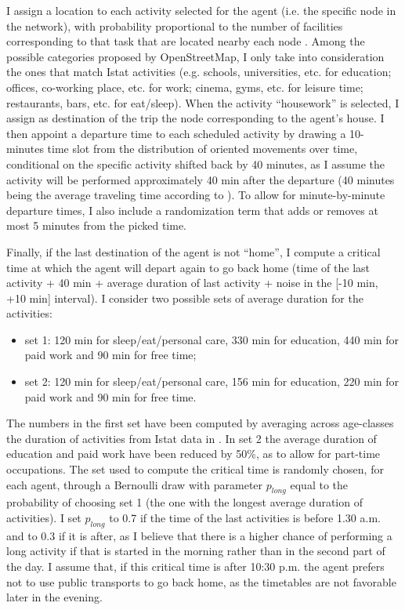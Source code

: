 I assign a location to each activity selected for the agent (i.e. the specific node in the network), with probability proportional to the number of facilities corresponding to that task that are located nearby each node \cite{site9}. Among the possible categories proposed by OpenStreetMap, I only take into consideration the ones that match Istat activities (e.g. schools, universities, etc. for education; offices, co-working place, etc. for work; cinema, gyms, etc. for leisure time; restaurants, bars, etc. for eat/sleep). When the activity “housework” is selected, I assign as destination of the trip the node corresponding to the agent’s house. I then appoint a departure time to each scheduled activity by drawing a 10-minutes time slot from the distribution of oriented movements over time, conditional on the specific activity \cite{site11} shifted back by 40 minutes, as I assume the activity will be performed approximately 40 min after the departure (40 minutes being the average traveling time according to \cite{bib2}). To allow for minute-by-minute departure times, I also include a randomization term that adds or removes at most 5 minutes from the picked time. 

Finally, if the last destination of the agent is not “home”, I compute a critical time at which the agent will depart again to go back home (time of the last activity + 40 min + average duration of last activity + noise in the [-10 min, +10 min] interval). I consider two possible sets of average duration for the activities:
\begin{itemize}
\item set 1: 120 min for sleep/eat/personal care, 330 min for education, 440 min for paid work and 90 min for free time;
\item set 2: 120 min for sleep/eat/personal care, 156 min for education, 220 min for paid work and 90 min for free time.
\end{itemize}
The numbers in the first set have been computed by averaging across age-classes the duration of activities from Istat data in \cite{site11}. In set 2 the average duration of education and paid work have been reduced by 50\%, as to allow for part-time occupations. 
The set used to compute the critical time is randomly chosen, for each agent, through a Bernoulli draw with parameter $p_{long}$ equal to the probability of choosing set 1 (the one with the longest average duration of activities). I set $p_{long}$ to 0.7 if the time of the last activities is before 1.30 a.m. and to 0.3 if it is after, as I believe that there is a higher chance of performing a long activity if that is started in the morning rather than in the second part of the day.
I assume that, if this critical time is after 10:30 p.m. the agent prefers not to use public transports to go back home, as the timetables are not favorable later in the evening. 


